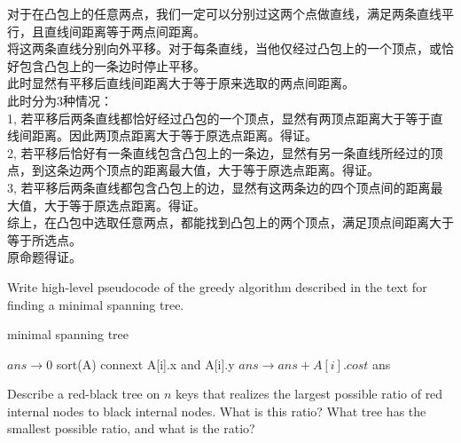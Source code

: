 \documentclass[a4paper, justified]{tufte-handout}
\begin{document}
\begin{solution}
  对于在凸包上的任意两点，我们一定可以分别过这两个点做直线，满足两条直线平行，且直线间距离等于两点间距离。\\
  将这两条直线分别向外平移。对于每条直线，当他仅经过凸包上的一个顶点，或恰好包含凸包上的一条边时停止平移。\\
  此时显然有平移后直线间距离大于等于原来选取的两点间距离。\\
  此时分为3种情况：\\
  1, 若平移后两条直线都恰好经过凸包的一个顶点，显然有两顶点距离大于等于直线间距离。因此两顶点距离大于等于原选点距离。得证。\\
  2, 若平移后恰好有一条直线包含凸包上的一条边，显然有另一条直线所经过的顶点，到这条边两个顶点的距离最大值，大于等于原选点距离。得证。\\
  3, 若平移后两条直线都包含凸包上的边，显然有这两条边的四个顶点间的距离最大值，大于等于原选点距离。得证。\\
  综上，在凸包中选取任意两点，都能找到凸包上的两个顶点，满足顶点间距离大于等于所选点。\\
  原命题得证。
\end{solution}

\begin{problem}[2-6.3 DH 4-12]
Write high-level pseudocode of the greedy algorithm described in the text
for finding a minimal spanning tree.
\end{problem}

\begin{solution}
  \begin{algorithm}
    \caption{minimal spanning tree}\label{euclid}
    \begin{algorithmic}[1]
      \State $ans \to 0$
      \State sort(A)
      \State connext A[i].x and A[i].y
      \State $ans\to ans+A[i].cost$
      \EndIf
      \EndFor
      \State \Return ans
      \EndProcedure
    \end{algorithmic}
  \end{algorithm}

\end{solution}

\begin{problem}[2-15.2 TC 13.1-7]
Describe a red-black tree on $n$ keys that realizes the largest possible ratio of red internal nodes to black internal nodes. What is this ratio? What tree has the smallest possible ratio, and what is the ratio?
\end{problem}
\end{document}
